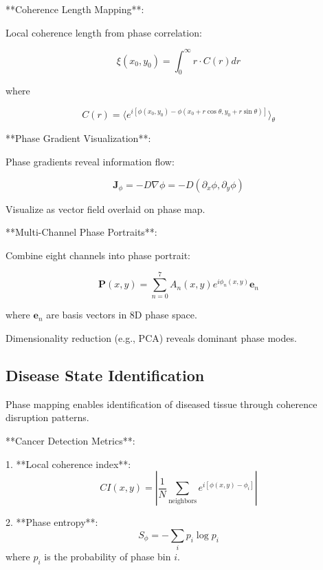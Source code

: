 \documentclass[12pt,a4paper]{report}
\begin{document}
**Coherence Length Mapping**:

Local coherence length from phase correlation:

\begin{equation}
\xi(x_0, y_0) = \int_0^\infty r \cdot C(r) dr
\end{equation}

where

\begin{equation}
C(r) = \langle e^{i[\phi(x_0, y_0) - \phi(x_0 + r\cos\theta, y_0 + r\sin\theta)]} \rangle_\theta
\end{equation}

**Phase Gradient Visualization**:

Phase gradients reveal information flow:

\begin{equation}
\mathbf{J}_\phi = -D \nabla \phi = -D(\partial_x \phi, \partial_y \phi)
\end{equation}

Visualize as vector field overlaid on phase map.

**Multi-Channel Phase Portraits**:

Combine eight channels into phase portrait:

\begin{equation}
\mathbf{P}(x, y) = \sum_{n=0}^{7} A_n(x, y) e^{i\phi_n(x, y)} \mathbf{e}_n
\end{equation}

where $\mathbf{e}_n$ are basis vectors in 8D phase space.

Dimensionality reduction (e.g., PCA) reveals dominant phase modes.

\subsection{Disease State Identification}

Phase mapping enables identification of diseased tissue through coherence disruption patterns.

**Cancer Detection Metrics**:

1. **Local coherence index**:
   \begin{equation}
   CI(x, y) = \left|\frac{1}{N} \sum_{\text{neighbors}} e^{i[\phi(x, y) - \phi_i]}\right|
   \end{equation}

2. **Phase entropy**:
   \begin{equation}
   S_\phi = -\sum_i p_i \log p_i
   \end{equation}
   where $p_i$ is the probability of phase bin $i$.
\end{document}

